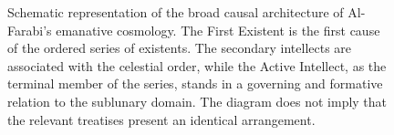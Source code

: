 \begin{figure}[htbp]
\begin{tikzpicture}
\end{tikzpicture}

\caption{Schematic representation of the broad causal architecture of
Al-Farabi's emanative cosmology. The First Existent is the first cause of
the ordered series of existents. The secondary intellects are associated
with the celestial order, while the Active Intellect, as the terminal member
of the series, stands in a governing and formative relation to the sublunary
domain. The diagram does not imply that the relevant treatises present an
identical arrangement.}

\label{fig:VS.B01.P01.C08.S12.SS09.P004.DG01}

\end{figure}

